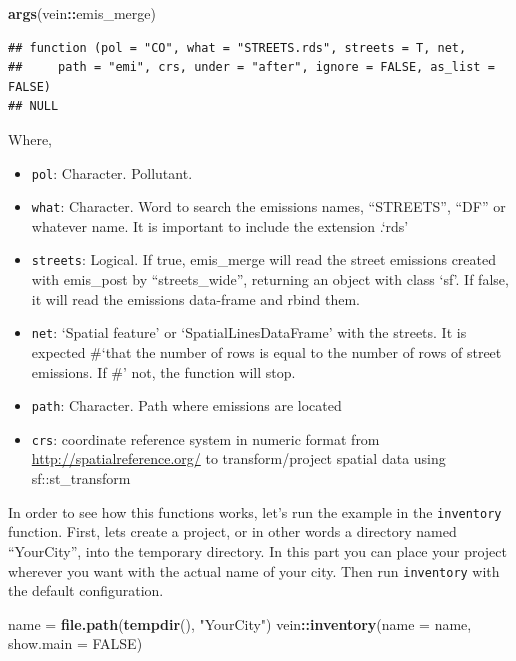 \documentclass[12pt,graybox,envcountchap,sectrefs]{krantz}
\makeatletter
\newenvironment{Shaded}{\begin{snugshade}}{\end{snugshade}}
\newcommand{\KeywordTok}[1]{\textcolor[rgb]{0.13,0.29,0.53}{\textbf{#1}}}
\newcommand{\DataTypeTok}[1]{\textcolor[rgb]{0.13,0.29,0.53}{#1}}
\newcommand{\StringTok}[1]{\textcolor[rgb]{0.31,0.60,0.02}{#1}}
\newcommand{\OtherTok}[1]{\textcolor[rgb]{0.56,0.35,0.01}{#1}}
\newcommand{\OperatorTok}[1]{\textcolor[rgb]{0.81,0.36,0.00}{\textbf{#1}}}
\newcommand{\NormalTok}[1]{#1}
\providecommand{\tightlist}{%
  \setlength{\itemsep}{0pt}\setlength{\parskip}{0pt}}
\newenvironment{kframe}{%
\medskip{}
\setlength{\fboxsep}{.8em}
 \def\at@end@of@kframe{}%
 \ifinner\ifhmode%
  \def\at@end@of@kframe{\end{minipage}}%
  \begin{minipage}{\columnwidth}%
 \fi\fi%
 \def\FrameCommand##1{\hskip\@totalleftmargin \hskip-\fboxsep
 \colorbox{shadecolor}{##1}\hskip-\fboxsep
     \hskip-\linewidth \hskip-\@totalleftmargin \hskip\columnwidth}%
 \MakeFramed {\advance\hsize-\width
   \@totalleftmargin\z@ \linewidth\hsize
   \@setminipage}}%
 {\par\unskip\endMakeFramed%
 \at@end@of@kframe}
\renewenvironment{Shaded}{\begin{kframe}}{\end{kframe}}
\theoremstyle{definition}
\theoremstyle{definition}
\theoremstyle{definition}
\theoremstyle{remark}
\makeatother
\begin{document}
\begin{Shaded}
\begin{Highlighting}[]
\KeywordTok{args}\NormalTok{(vein}\OperatorTok{::}\NormalTok{emis_merge)}
\end{Highlighting}
\end{Shaded}

\begin{verbatim}
## function (pol = "CO", what = "STREETS.rds", streets = T, net, 
##     path = "emi", crs, under = "after", ignore = FALSE, as_list = FALSE) 
## NULL
\end{verbatim}

Where,

\begin{itemize}
\tightlist
\item
  \texttt{pol}: Character. Pollutant.
\item
  \texttt{what}: Character. Word to search the emissions names,
  ``STREETS'', ``DF'' or whatever name. It is important to include the
  extension .`rds'
\item
  \texttt{streets}: Logical. If true, emis\_merge will read the street
  emissions created with emis\_post by ``streets\_wide'', returning an
  object with class `sf'. If false, it will read the emissions
  data-frame and rbind them.
\item
  \texttt{net}: `Spatial feature' or `SpatialLinesDataFrame' with the
  streets. It is expected \#`that the number of rows is equal to the
  number of rows of street emissions. If \#' not, the function will
  stop.
\item
  \texttt{path}: Character. Path where emissions are located
\item
  \texttt{crs}: coordinate reference system in numeric format from
  \url{http://spatialreference.org/} to transform/project spatial data
  using sf::st\_transform
\end{itemize}

In order to see how this functions works, let's run the example in the
\texttt{inventory} function. First, lets create a project, or in other
words a directory named ``YourCity'', into the temporary directory. In
this part you can place your project wherever you want with the actual
name of your city. Then run \texttt{inventory} with the default
configuration.

\begin{Shaded}
\begin{Highlighting}[]
\NormalTok{name =}\StringTok{ }\KeywordTok{file.path}\NormalTok{(}\KeywordTok{tempdir}\NormalTok{(), }\StringTok{"YourCity"}\NormalTok{)}
\NormalTok{vein}\OperatorTok{::}\KeywordTok{inventory}\NormalTok{(}\DataTypeTok{name =}\NormalTok{ name, }\DataTypeTok{show.main =} \OtherTok{FALSE}\NormalTok{)}
\end{Highlighting}
\end{Shaded}
\end{document}
